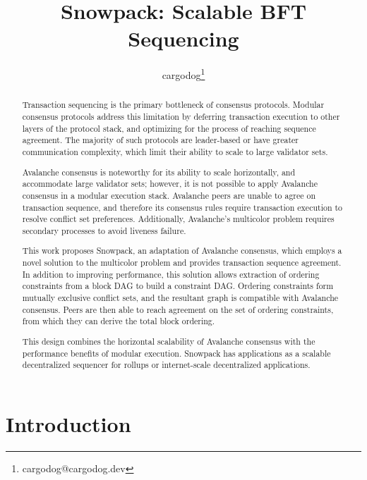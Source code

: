 \documentclass[12pt]{article}
\begin{document}
\title{Snowpack: Scalable BFT Sequencing}
\author{cargodog\thanks{cargodog@cargodog.dev}}
\maketitle

\begin{abstract}
  Transaction sequencing is the primary bottleneck of consensus protocols.
  Modular consensus protocols address this limitation by deferring transaction
  execution to other layers of the protocol stack, and optimizing for the
  process of reaching sequence agreement. The majority of such protocols are
  leader-based or have greater communication complexity, which limit their
  ability to scale to large validator sets.

  Avalanche consensus is noteworthy for its ability to scale horizontally, and
  accommodate large validator sets; however, it is not possible to apply
  Avalanche consensus in a modular execution stack. Avalanche peers are unable
  to agree on transaction sequence, and therefore its consensus rules require
  transaction execution to resolve conflict set preferences. Additionally,
  Avalanche's multicolor problem requires secondary processes to avoid liveness
  failure.

  This work proposes Snowpack, an adaptation of Avalanche consensus, which
  employs a novel solution to the multicolor problem and provides transaction
  sequence agreement. In addition to improving performance, this solution
  allows extraction of ordering constraints from a block DAG to build a
  constraint DAG. Ordering constraints form mutually exclusive conflict sets,
  and the resultant graph is compatible with Avalanche consensus. Peers are
  then able to reach agreement on the set of ordering constraints, from which
  they can derive the total block ordering.

  This design combines the horizontal scalability of Avalanche consensus with
  the performance benefits of modular execution. Snowpack has applications as a
  scalable decentralized sequencer for rollups or internet-scale decentralized
  applications.
\end{abstract}

\section{Introduction}
\end{document}
